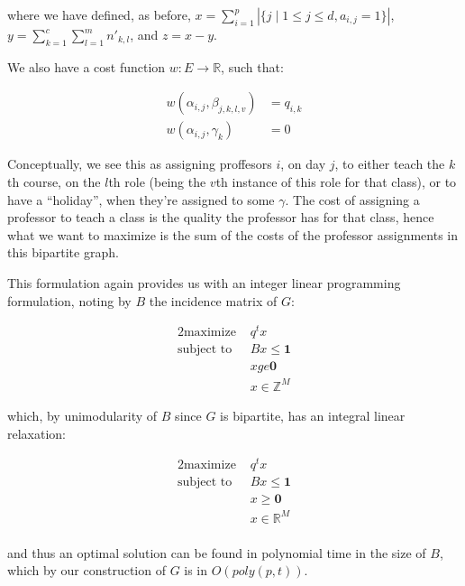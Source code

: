where we have defined, as before, $x = \sum_{i = 1}^p |\{j \mid 1 \le j \le d, a_{i, j} = 1\}|$, $y = \sum_{k = 1}^c \sum_{l = 1}^m n'_{k, l}$, and $z = x - y$.

We also have a cost function $w:E \to \mathbb{R}$, such that:

\begin{align*}
  w(\alpha_{i, j}, \beta_{j, k, l, v}) &= q_{i, k}\\
  w(\alpha_{i, j}, \gamma_k) &= 0
\end{align*}

Conceptually, we see this as assigning proffesors $i$, on day $j$, to either teach the $k$th course, on the $l$th role (being the $v$th instance of this role for that class), or to have a ``holiday'', when they're assigned to some $\gamma$. The cost of assigning a professor to teach a class is the quality the professor has for that class, hence what we want to maximize is the sum of the costs of the professor assignments in this bipartite graph.

This formulation again provides us with an integer linear programming formulation, noting by $B$ the incidence matrix of $G$:

\begin{alignat*}{2}
  \text{maximize }   & q^t x \\
  \text{subject to } & Bx \le \mathbf{1}\\
                     & x ge \mathbf{0}\\
                     & x \in \mathbb{Z}^M
\end{alignat*}

which, by unimodularity of $B$ since $G$ is bipartite,  has an integral linear relaxation:

\begin{alignat*}{2}
  \text{maximize }   & q^t x \\
  \text{subject to } & Bx \le \mathbf{1}\\
                     & x \ge \mathbf{0}\\
                     & x \in \mathbb{R}^M\\
\end{alignat*}

and thus an optimal solution can be found in polynomial time in the size of $B$, which by our construction of $G$ is in $O(poly(p, t))$.
